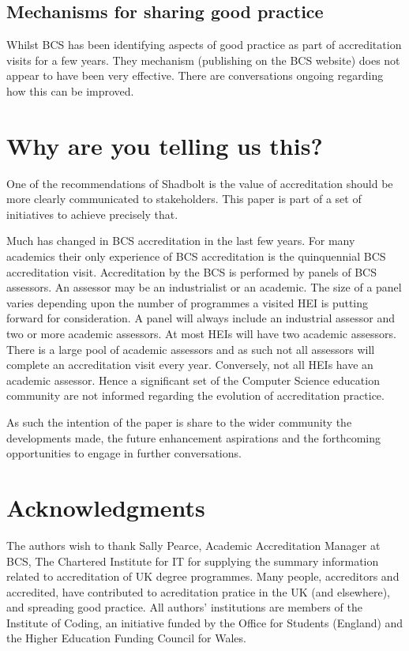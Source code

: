 \documentclass[sigconf]{acmart}
\begin{document}
\subsection {Mechanisms for sharing good practice}
Whilst BCS has been identifying aspects of good practice as part of accreditation visits for a few years. They mechanism (publishing on the BCS website) does not appear to have been very effective.  There are conversations ongoing regarding how this can be improved.

\section{Why are you telling us this?}	

One of the recommendations of Shadbolt is the value of accreditation should be more clearly communicated to stakeholders. This paper is part of a set of initiatives to achieve precisely that.

Much has changed in BCS accreditation in the last few years. For many academics their only experience of BCS accreditation is the quinquennial BCS accreditation visit. Accreditation by the BCS is performed by panels of BCS assessors. An assessor may be an industrialist or an academic. The size of a panel varies depending upon the number of programmes a visited HEI is putting forward for consideration. A panel will always include an industrial assessor and two or more academic assessors.  At most HEIs will have two academic assessors.  There is a large pool of academic assessors and as such not all assessors will complete an accreditation visit every year. Conversely, not all HEIs have an academic assessor. Hence a significant set of the Computer Science education community are not informed regarding the evolution of accreditation practice.

As such the intention of the paper is share to the wider community the developments made, the future enhancement aspirations and the forthcoming opportunities to engage in further conversations.

\section{Acknowledgments}
The authors wish to thank Sally Pearce, Academic Accreditation Manager at BCS, The Chartered Institute for IT for supplying the summary information related to accreditation of UK degree programmes. Many people, accreditors and accredited, have contributed to acreditation pratice in the UK (and elsewhere), and spreading good practice.  All authors' institutions are members of the Institute of Coding, an initiative funded by the Office for Students (England) and the Higher Education Funding Council for Wales.

%

\end{document}
